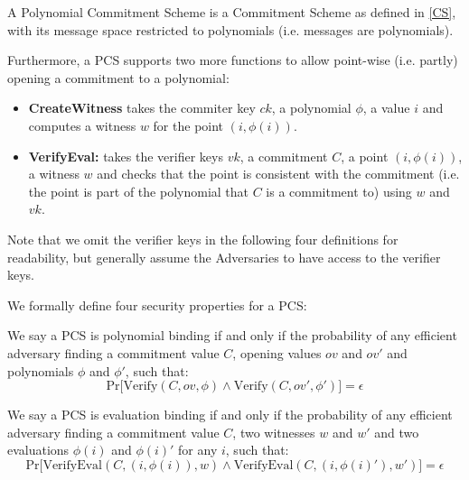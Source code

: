 \begin{definition}
    \label{PCS_def}
    A Polynomial Commitment Scheme is a Commitment Scheme as defined in \ref*{CS}, with its message space restricted to polynomials (i.e. messages are polynomials). 
    
    Furthermore, a PCS supports two more functions to allow point-wise (i.e. partly) opening a commitment to a polynomial: 
    \begin{itemize}
        \item \textbf{CreateWitness}
        takes the commiter key $ck$, a polynomial $\phi$, a value $i$ and computes a witness $w$ for the point $(i, \phi(i))$. 
        \item \textbf{VerifyEval:} 
        takes the verifier keys $vk$, a commitment $C$, a point $(i, \phi(i))$, a witness $w$ and checks that the point is consistent with the commitment (i.e. the point is part of the polynomial that $C$ is a commitment to) using $w$ and $vk$.
    \end{itemize}
\end{definition}

Note that we omit the verifier keys in the following four definitions for readability, but generally assume the Adversaries to have access to the verifier keys. 

We formally define four security properties for a PCS:

\begin{definition}
    We say a PCS is polynomial binding if and only if the probability of any efficient adversary finding a commitment value $C$, opening values $ov$ and $ov'$ and polynomials $\phi$ and $\phi'$, such that:
    \begin{equation*}
        \text{Pr}\big[
            \text{Verify}(C,ov,\phi) \land \text{Verify}(C,ov',\phi')
        \big]
        = \epsilon
    \end{equation*}
    \parencite{KZG}
\end{definition}

\begin{definition}
    We say a PCS is evaluation binding if and only if the probability of any efficient adversary finding a commitment value $C$, two witnesses $w$ and $w'$ and two evaluations $\phi(i)$ and $\phi(i)'$ for any $i$, such that:
    \begin{equation*}
        \text{Pr}\big[
            \text{VerifyEval}(C,(i,\phi(i)), w) \land \text{VerifyEval}(C,(i,\phi(i)'), w')
        \big]
        = \epsilon
    \end{equation*}
    \parencite{KZG}
\end{definition}

